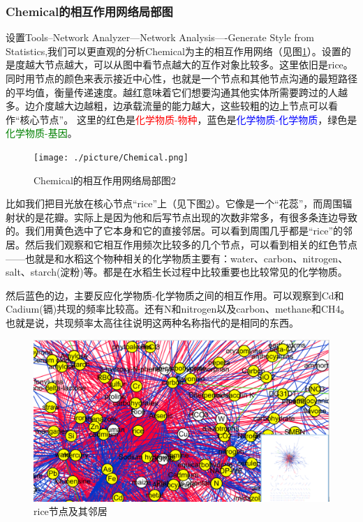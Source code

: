 \documentclass[12pt]{article}
\begin{document}
	\subsubsection{Chemical的相互作用网络局部图}
	设置Tools--Network Analyzer---Network Analysis----Generate Style from Statistics,我们可以更直观的分析Chemical为主的相互作用网络（见图\ref{sssddffgg}）。设置的是度越大节点越大，可以从图中看节点越大的互作对象比较多。这里依旧是rice。同时用节点的颜色来表示接近中心性，也就是一个节点和其他节点沟通的最短路径的平均值，衡量传递速度。越红意味着它们想要沟通其他实体所需要跨过的人越多。边介度越大边越粗，边承载流量的能力越大，这些较粗的边上节点可以看作“核心节点”。
	这里的红色是\textcolor{red}{化学物质-物种}，蓝色是\textcolor{blue}{化学物质-化学物质}，绿色是\textcolor{green}{化学物质-基因}。
	\begin{figure}[H]
  \centering
  \texttt{[image: ./picture/Chemical.png]} %
  \caption{Chemical的相互作用网络局部图2} %
  \label{sssddffgg} %
\end{figure}
比如我们把目光放在核心节点“rice”上（见下图\ref{asjdiajhsd}）。它像是一个“花蕊”，而周围辐射状的是花瓣。实际上是因为他和后写节点出现的次数非常多，有很多条连边导致的。我们用黄色选中了它本身和它的直接邻居。可以看到周围几乎都是“rice”的邻居。然后我们观察和它相互作用频次比较多的几个节点，可以看到相关的红色节点——也就是和水稻这个物种相关的化学物质主要有：water、carbon、nitrogen、salt、starch(淀粉)等。都是在水稻生长过程中比较重要也比较常见的化学物质。\par
然后蓝色的边，主要反应化学物质-化学物质之间的相互作用。可以观察到Cd和Cadium(镉)共现的频率比较高。还有N和nitrogen以及carbon、methane和CH4。也就是说，共现频率太高往往说明这两种名称指代的是相同的东西。
	\begin{figure}[H]
  \centering
  \includegraphics[scale=0.5]{./picture/rice.png} %
  \caption{rice节点及其邻居} %
  \label{asjdiajhsd} %
\end{figure}
\end{document}
